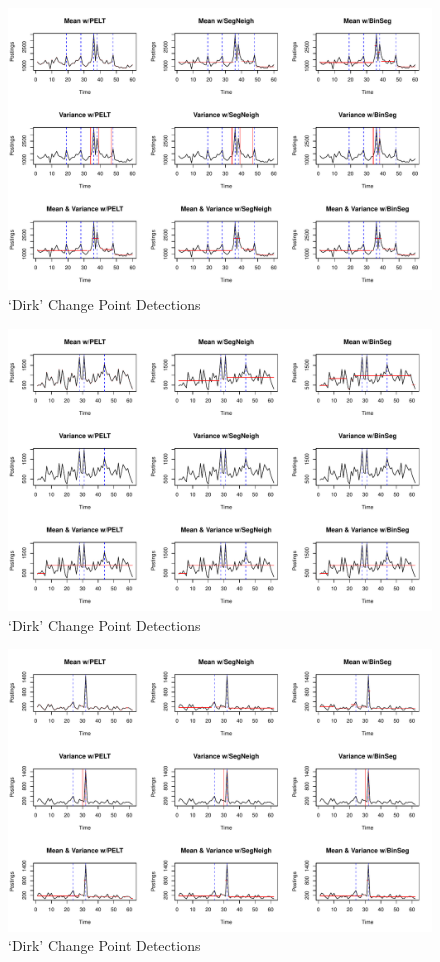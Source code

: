 \documentclass{uvamscse}	%
\begin{document}
\begin{figure}[h]
    \includegraphics[width=\textwidth]{figures/ziggoresults}
    \caption{`Dirk' Change Point Detections}
    \label{fig:ziggo}
\end{figure}


\begin{figure}[h]
    \includegraphics[width=\textwidth]{figures/bolresults}
    \caption{`Dirk' Change Point Detections}
    \label{fig:bol}
\end{figure}


\begin{figure}[h]
    \includegraphics[width=\textwidth]{figures/connexxionresults}
    \caption{`Dirk' Change Point Detections}
    \label{fig:connexxion}
\end{figure}
\end{document}
